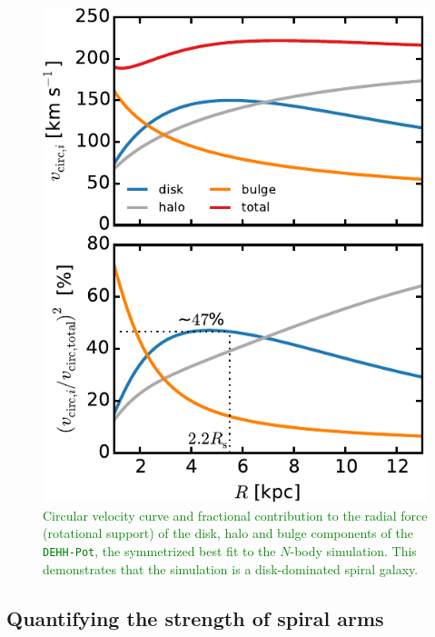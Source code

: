 \documentclass[iop,revtex4,numberedappendix,appendixfloats]{emulateapj}
\newcommand{\NEW}[1]{\textcolor{Green}{#1}}
\begin{document}
\begin{figure}[!htbp]
\centering
\includegraphics[width=0.7\columnwidth]{fig/plot_vcirc_decomposed.pdf}
\caption{\NEW{Circular velocity curve and fractional contribution to the radial force (rotational support) of the disk, halo and bulge components of the \texttt{DEHH-Pot}, the symmetrized best fit to the $N$-body simulation. This demonstrates that the simulation is a disk-dominated spiral galaxy.}}
\label{fig:DEHH_vcirc_decomposed}
\end{figure}

\subsection{Quantifying the strength of spiral arms} \label{sec:spiral_arm_DeltaS}
\end{document}

